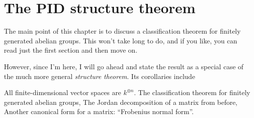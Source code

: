 \chapter{The PID structure theorem}
\label{ch:PID_structure_theorem}
The main point of this chapter is to discuss a classification
theorem for finitely generated abelian groups.
This won't take long to do, and if you like, you can read
just the first section and then move on.

However, since I'm here, I will go ahead and state the result as a
special case of the much more general \emph{structure theorem}.
Its corollaries include
\begin{itemize}
	\ii All finite-dimensional vector spaces are $k^{\oplus n}$.
	\ii The classification theorem for finitely generated abelian groups,
	\ii The Jordan decomposition of a matrix from before,
	\ii Another canonical form for a matrix: ``Frobenius normal form''.
\end{itemize}


